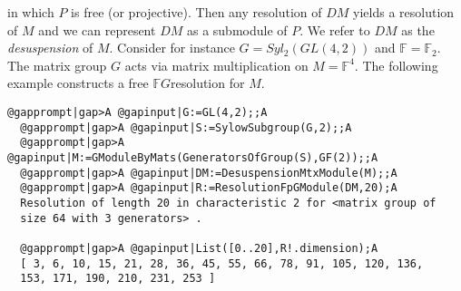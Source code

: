 \documentclass[a4paper,11pt]{report}
\begin{document}
{{ in which $P$ is free (or projective). Then any resolution of $DM$ yields a resolution of $M$ and we can represent $DM$ as a submodule of $P$. We refer to $DM$ as the \emph{desuspension} of $M$. Consider for instance $G=Syl_2(GL(4,2))$ and $\mathbb F=\mathbb F_2$. The matrix group $G$ acts via matrix multiplication on $M=\mathbb F^4$. The following example constructs a free $\mathbb FG$\texttt{}resolution for $M$. 
\begin{Verbatim}[commandchars=@|A,fontsize=\small,frame=single,label=Example]
  @gapprompt|gap>A @gapinput|G:=GL(4,2);;A
  @gapprompt|gap>A @gapinput|S:=SylowSubgroup(G,2);;A
  @gapprompt|gap>A @gapinput|M:=GModuleByMats(GeneratorsOfGroup(S),GF(2));;A
  @gapprompt|gap>A @gapinput|DM:=DesuspensionMtxModule(M);;A
  @gapprompt|gap>A @gapinput|R:=ResolutionFpGModule(DM,20);A
  Resolution of length 20 in characteristic 2 for <matrix group of 
  size 64 with 3 generators> .
  
  @gapprompt|gap>A @gapinput|List([0..20],R!.dimension);A
  [ 3, 6, 10, 15, 21, 28, 36, 45, 55, 66, 78, 91, 105, 120, 136, 
  153, 171, 190, 210, 231, 253 ]
  
\end{Verbatim}
 }

 }

 
\end{document}

